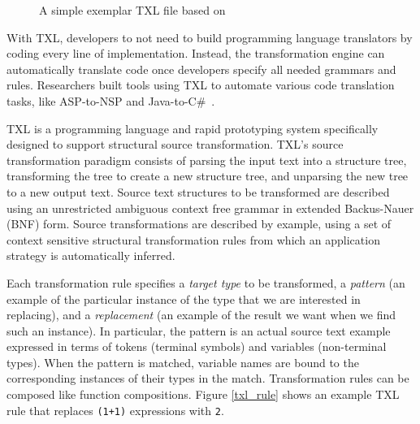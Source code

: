\documentclass[runningheads,a4paper]{llncs}
\newcommand{\codefont}[1]{\footnotesize{\texttt{#1}}\normalsize}
\begin{document}
\begin{figure}
\centering
{}
\caption{A simple exemplar TXL file based on~\cite{txltour}}
\label{fig:txl}
\end{figure}
With TXL, developers to not need to build programming language translators by coding every line of implementation. Instead, the transformation engine can automatically translate code once developers specify all needed grammars and rules. Researchers built tools using TXL to automate various code translation tasks, like ASP-to-NSP and Java-to-C\#~\cite{Chu:08,Hassan:2005,El-Ramly:2006,Tonella:04}.

TXL is a programming language and rapid prototyping system specifically designed to support structural source transformation. TXL's source transformation paradigm consists of parsing the input text into a structure tree, transforming the tree to create a new structure tree, and unparsing the new tree to a new output text. Source text structures to be transformed are described using an unrestricted ambiguous context free grammar in extended Backus-Nauer (BNF) form. Source transformations are described by example, using a set of context sensitive structural transformation rules from which an application strategy is automatically inferred. 

Each transformation rule specifies a {\em target type} to be transformed, a {\em pattern} (an example of the particular instance of the type that we are interested in replacing), and a {\em replacement} (an example of the result we want when we find such an instance). In particular, the pattern is an actual source text example expressed in terms of tokens (terminal symbols) and variables (non-terminal types). When the pattern is matched, variable names are bound to the corresponding instances of their types in the match. Transformation rules can be composed like function compositions.  Figure \ref{txl_rule} shows an example TXL rule that replaces \codefont{(1+1)} expressions with \codefont{2}. 
\end{document}
